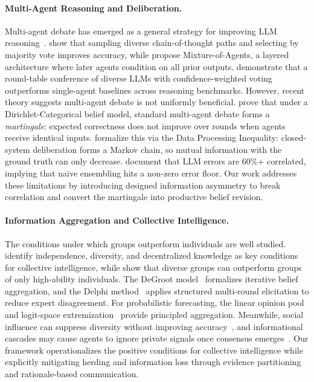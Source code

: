 \documentclass[11pt]{article}
\theoremstyle{plain}
\theoremstyle{definition}
\begin{document}
\paragraph{Multi-Agent Reasoning and Deliberation.}
Multi-agent debate has emerged as a general strategy for improving LLM reasoning~\citep{du2023improving}.
\citet{wangself} show that sampling diverse chain-of-thought paths and selecting by majority vote improves accuracy, while \citet{wangmixture} propose Mixture-of-Agents, a layered architecture where later agents condition on all prior outputs.
\citet{chen2024reconcile} demonstrate that a round-table conference of diverse LLMs with confidence-weighted voting outperforms single-agent baselines across reasoning benchmarks.
However, recent theory suggests multi-agent debate is not uniformly beneficial.
\citet{choi2025debate} prove that under a Dirichlet-Categorical belief model, standard multi-agent debate forms a \textit{martingale}: expected correctness does not improve over rounds when agents receive identical inputs.
\citet{reasoningtrap2025} formalize this via the Data Processing Inequality: closed-system deliberation forms a Markov chain, so mutual information with the ground truth can only decrease.
\citet{kim2025correlated} document that LLM errors are 60\%+ correlated, implying that naive ensembling hits a non-zero error floor.
Our work addresses these limitations by introducing designed information asymmetry to break correlation and convert the martingale into productive belief revision.

\vspace{-0.5em}

\paragraph{Information Aggregation and Collective Intelligence.}
The conditions under which groups outperform individuals are well studied.
\citet{surowiecki2004wisdom} identify independence, diversity, and decentralized knowledge as key conditions for collective intelligence, while \citet{hong2004groups} show that diverse groups can outperform groups of only high-ability individuals.
The DeGroot model~\citep{612bb50a-4bdd-3a32-b6eb-7837600cc9c4} formalizes iterative belief aggregation, and the Delphi method~\citep{DALKEY1969408} applies structured multi-round elicitation to reduce expert disagreement.
For probabilistic forecasting, the linear opinion pool~\citep{9ca5e582-1e4c-323f-9ab1-c62032d22e48} and logit-space extremization~\citep{SATOPAA2014344} provide principled aggregation.
Meanwhile, social influence can suppress diversity without improving accuracy~\citep{Lorenz2011HowSI}, and informational cascades may cause agents to ignore private signals once consensus emerges~\citep{bikhchandani1992theory}.
Our framework operationalizes the positive conditions for collective intelligence while explicitly mitigating herding and information loss through evidence partitioning and rationale-based communication.
\end{document}
